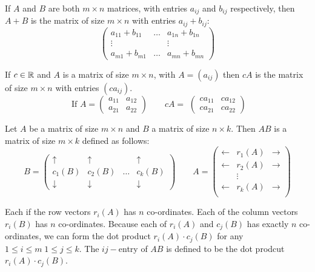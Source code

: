 \documentclass[10pt]{scrartcl}
\begin{document}

If $A$ and $B$ are both $m \times n$ matrices, with entries $a_{ij}$ and $b_{ij}$ respectively, then $A+B$ is the matrix of size $m \times n$ with entries $a_{ij} + b_{ij}$: 
\[
  \begin{pmatrix}
  a_{11}+b_{11} & \dots & a_{1n} + b_{1n}\\
  \vdots & & \vdots\\
  a_{m1} + b_{m1} & \dots   & a_{mn} + b_{mn}
  \end{pmatrix}
\]\vspace*{5pt}


If $c \in\mathbb{R}$ and $A$ is a matrix of size $m \times n$, with $A= (a_{ij})$ then $cA$ is the matrix of size $m \times n$ with entries $(ca_{ij})$. 
\[
  \text{ If }
  A = \begin{pmatrix}
  a_{11} & a_{12}\\
  a_{21} & a_{22}
\end{pmatrix}
\qquad cA =  \begin{pmatrix}
  ca_{11} & ca_{12}\\
  ca_{21} & ca_{22}
\end{pmatrix}
\]


Let $A$ be a matrix of size $m \times n$ and $B$ a matrix of size $n \times k$. Then $AB$ is a matrix of size $m \times k$ defined as follows: 
\[
  B =\begin{pmatrix}
  \uparrow & \uparrow & & \uparrow\\
  c_1(B) & c_2(B) & \dots & c_k(B)\\
  \downarrow & \downarrow & & \downarrow
\end{pmatrix}
\qquad 
A = \begin{pmatrix}
 \leftarrow & r_1(A) & \rightarrow \\
 \leftarrow & r_2(A) &  \rightarrow\\
 	&\vdots & \\
  \leftarrow & r_k(A) &  \rightarrow\\
 \end{pmatrix}
\]

Each if the row vectors $r_i(A)$ has $n$ co-ordinates. Each of the column vectors $r_i(B)$ has $n$ co-ordinates. Because each of $r_i(A)$ and $c_j(B)$ has exactly $n$ co-ordinates, we can form the dot product $r_i(A) \cdot c_j(B)$ for any $1 \leq i \leq m\; 1 \leq j \leq k$. The $ij-$entry of $AB$ is defined to be the dot prodcut $r_i(A) \cdot c_j(B)$.\\
\end{document}
